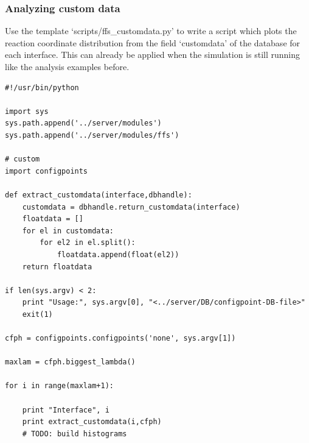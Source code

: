 \documentclass[a4paper,oneside]{article}
\newenvironment{mylisting}
{\begin{list}{}{\setlength{\leftmargin}{1em}}\item\scriptsize\bfseries}
{\end{list}}
\begin{document}
\subsubsection{Analyzing custom data}
Use the template `scripts/ffs\_customdata.py' to write a script which plots the reaction coordinate distribution from the field `customdata' of the database for each interface. This can already be applied when the simulation is still running like the analysis examples before.
\begin{mylisting}
\begin{verbatim}
#!/usr/bin/python

import sys
sys.path.append('../server/modules')
sys.path.append('../server/modules/ffs')

# custom
import configpoints

def extract_customdata(interface,dbhandle):
    customdata = dbhandle.return_customdata(interface)
    floatdata = []
    for el in customdata:
        for el2 in el.split():
            floatdata.append(float(el2))
    return floatdata

if len(sys.argv) < 2:
    print "Usage:", sys.argv[0], "<../server/DB/configpoint-DB-file>"
    exit(1)

cfph = configpoints.configpoints('none', sys.argv[1])

maxlam = cfph.biggest_lambda()

for i in range(maxlam+1):

    print "Interface", i
    print extract_customdata(i,cfph)
    # TODO: build histograms
\end{verbatim}
\end{mylisting}
\end{document}
